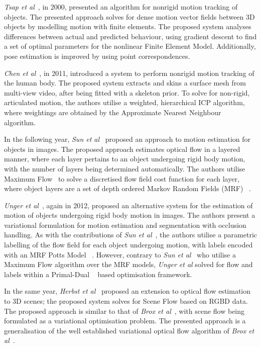 \textit{Tsap et al}~\cite{Tsap2000}, in 2000, presented an algorithm for nonrigid motion 
tracking of objects. The presented approach solves for dense motion vector fields between 
3D objects by modelling motion with finite elements. The proposed system analyses differences 
between actual and predicted behaviour, using gradient descent to find a set of optimal parameters 
for the nonlinear Finite Element Model. Additionally, pose estimation is improved by using point 
correspondences.

\textit{Chen et al}~\cite{Chen2011}, in 2011, introduced a system to perform nonrigid motion 
tracking of the human body. The proposed system extracts and skins a surface mesh from 
multi-view video, after being fitted with a skeleton prior. To solve for non-rigid, articulated 
motion, the authors utilise a weighted, hierarchical ICP algorithm, where weightings are obtained 
by the Approximate Nearest Neighbour~\cite{Indyk2000} algorithm.

In the following year, \textit{Sun et al}~\cite{Sun2012} proposed an approach to motion estimation 
for objects in images. The proposed approach estimates optical flow in a layered manner, where each 
layer pertains to an object undergoing rigid body motion, with the number of layers being determined 
automatically. The authors utilise Maximum Flow~\cite{Lamich2017} to solve a discretised flow field cost 
function for each layer, where object layers are a set of depth ordered Markov Random Fields (MRF) 
~\cite{BishopPRML, Murphy2012ML}.

\textit{Unger et al}~\cite{Unger2012}, again in 2012, proposed an alternative system for the 
estimation of motion of objects undergoing rigid body motion in images. The authors present a 
variational formulation for motion estimation and segmentation with occlusion handling. As with 
the contributions of \textit{Sun et al}~\cite{Sun2012}, the authors utilise a parametric labelling 
of the flow field for each object undergoing motion, with labels encoded with an MRF Potts Model
~\cite{Levada2008}. However, contrary to \textit{Sun et al}~\cite{Sun2012} who utilise a Maximum Flow 
algorithm over the MRF models, \textit{Unger et al} solved for flow and labels within a Primal-Dual
~\cite{Boyd2004Convex} based optimisation framework.

In the same year, \textit{Herbst et al}~\cite{Herbst2013} proposed an extension to optical 
flow estimation to 3D scenes; the proposed system solves for Scene Flow based on RGBD data. 
The proposed approach is similar to that of \textit{Brox et al}~\cite{Brox2004}, with scene flow 
being formulated as a variational optimisation problem. The presented approach is a generalisation 
of the well established variational optical flow algorithm of \textit{Brox et al}~\cite{Brox2004}.

